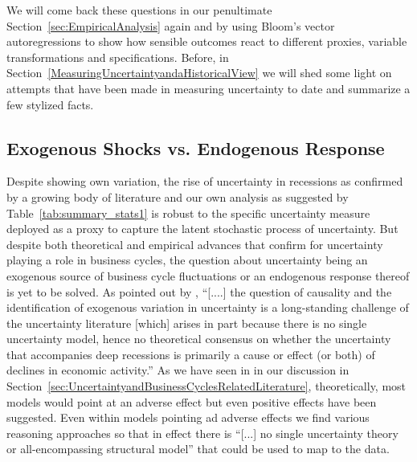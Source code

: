 \documentclass[a4paper,11pt,listof=nochaptergap,oneside,pointednumbers,bibtotoc,bigheadings,liststotoc]{scrbook}
\theoremstyle{mysatz}
\theoremstyle{mydefinition}
\theoremstyle{mybemerkung}
\begin{document}
We will come back these questions in our penultimate Section~\ref{sec:EmpiricalAnalysis} again and by using Bloom's vector autoregressions to show how sensible outcomes react to different proxies, variable transformations and specifications. Before, in Section~\ref{MeasuringUncertaintyandaHistoricalView} we will shed some light on attempts that have been made in measuring uncertainty to date and summarize a few stylized facts.

\subsection{Exogenous Shocks vs. Endogenous Response}
\label{sec:exoEndoJuradoetal}
Despite showing own variation, the rise of uncertainty in recessions as confirmed by a growing body of literature and our own analysis as suggested by Table~\ref{tab:summary_stats1} is robust to the specific uncertainty measure deployed as a proxy to capture the latent stochastic process of uncertainty. But despite both theoretical and empirical advances that confirm for uncertainty playing a role in business cycles, the question about uncertainty being an exogenous source of business cycle fluctuations or an endogenous response thereof is yet to be solved. As pointed out by \citet[p. 1]{ludvigsonetal:18}, ``[....] the question of causality and the identification of exogenous variation in uncertainty is a long-standing challenge of the uncertainty literature [which] arises in part because there is no single uncertainty model, hence no theoretical consensus on whether the uncertainty that accompanies deep recessions is primarily a cause or effect (or both) of declines in economic activity.'' As we have seen in in our discussion in Section~\ref{sec:UncertaintyandBusinessCyclesRelatedLiterature}, theoretically, most models would point at an adverse effect but even positive effects have been suggested. Even within models pointing ad adverse effects we find various reasoning approaches so that in effect there is ``[...] no single uncertainty theory or all-encompassing structural model'' \citep[p. 5]{ludvigsonetal:18} that could be used to map to the data.\\
\\
\end{document}
